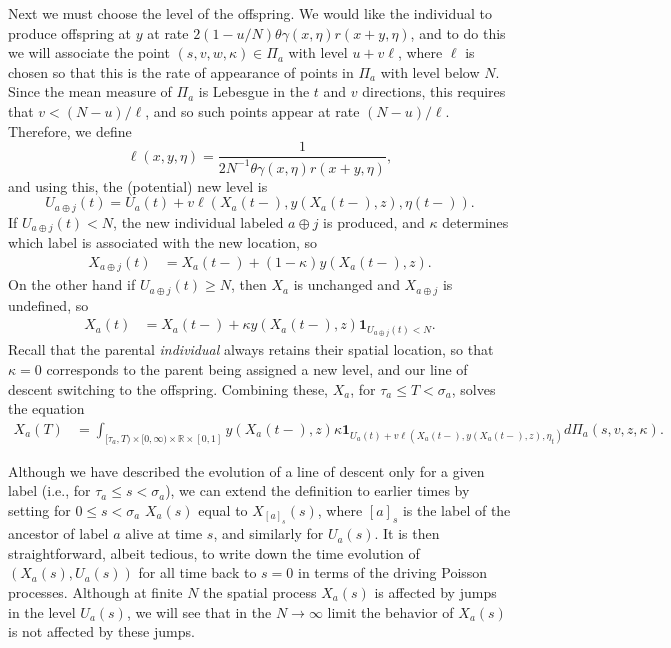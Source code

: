 \documentclass[12pt]{article}
\newcommand{\IR}{\mathbb R}
\newcommand{\ind}{\mathbf{1}}
\newcommand{\concat}{\oplus}   %
\begin{document}
Next we must choose the level of the offspring.
We would like the individual to produce offspring at $y$ at rate
$2 (1 - u/N) \theta \gamma(x, \eta) r(x + y, \eta)$,
and to do this
we will associate the point $(s, v, w, \kappa) \in \Pi_a$ with level $u + v \ell$,
where $\ell$ is chosen so that this is the rate of appearance of points in $\Pi_a$
with level below $N$.
Since the mean measure of $\Pi_a$ is Lebesgue in the $t$ and $v$ directions,
this requires that $v < (N - u) / \ell$, 
and so such points appear at rate $(N-u)/\ell$.
Therefore, we define
$$
    \ell(x, y, \eta)
    =
    \frac{
        1
    }{
        2 N^{-1} \theta \gamma(x, \eta) r(x + y, \eta)
    } ,
$$
and using this, the (potential) new level is
\begin{equation*}
    U_{a \concat j}(t)
    =
    U_a(t)
    +
    v \ell(X_a(t-), y(X_a(t-), z), \eta(t-)) .
\end{equation*}
If $U_{a \concat j}(t) < N$,
the new individual labeled $a \concat j$ is produced,
and $\kappa$ determines which label is associated with the new location,
so
\begin{align*}
    X_{a \concat j}(t)
    &=
    X_a(t-) + (1 - \kappa) y(X_a(t-), z) .
\end{align*}
On the other hand
if $U_{a \concat j}(t) \ge N$, then $X_a$ is unchanged and $X_{a \concat j}$ is undefined,
so
\begin{align} \label{eqn:X_line_of_descent}
    X_a(t)
    &=
    X_a(t-) + \kappa y(X_a(t-), z) \ind_{U_{a \concat j}(t) < N} .
\end{align}
Recall that the parental \emph{individual} always retains their spatial location,
so that $\kappa = 0$ corresponds to the parent being assigned a new level,
and our line of descent switching to the offspring.
Combining these, $X_a$, for $\tau_a \le T < \sigma_a$, solves the equation 
\begin{align*}
    X_a(T)
    &=
    \int_{[\tau_a, T) \times [0, \infty) \times \IR \times [0, 1]}
    y(X_a(t-), z)
    \kappa
    \ind_{
        U_a(t) + v \ell(X_a(t-), y(X_a(t-), z), \eta_t)
    }
    d\Pi_a(s, v, z, \kappa) .
\end{align*}

Although we have described the evolution of a line of descent only for a given label
(i.e., for $\tau_a \le s < \sigma_a$),
we can extend the definition to earlier times
by setting for $0 \le s < \sigma_a$
$X_a(s)$ equal to $X_{[a]_s}(s)$,
where $[a]_s$ is the label of the ancestor of label $a$ alive at time $s$,
and similarly for $U_a(s)$.
It is then straightforward, albeit tedious,
to write down the time evolution of $(X_a(s), U_a(s))$ for all time back to $s=0$
in terms of the driving Poisson processes.
Although at finite $N$ the spatial process $X_a(s)$ is affected by jumps in the level $U_a(s)$,
we will see that in the $N \to \infty$ limit
the behavior of $X_a(s)$ is not affected by these jumps.
\end{document}
